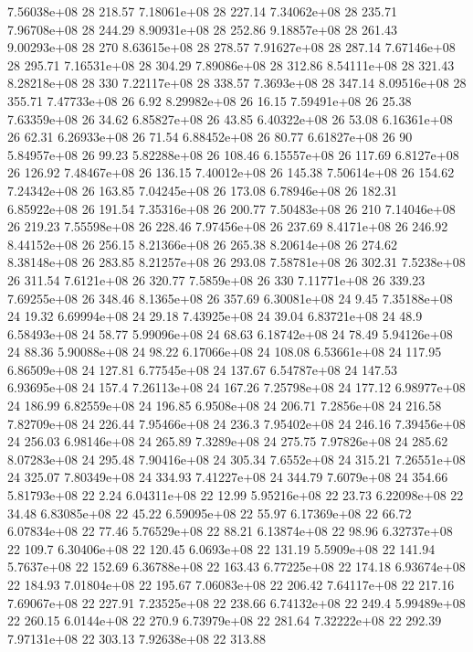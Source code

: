 7.56038e+08 28 218.57
7.18061e+08 28 227.14
7.34062e+08 28 235.71
7.96708e+08 28 244.29
8.90931e+08 28 252.86
9.18857e+08 28 261.43
9.00293e+08 28 270
8.63615e+08 28 278.57
7.91627e+08 28 287.14
7.67146e+08 28 295.71
7.16531e+08 28 304.29
7.89086e+08 28 312.86
8.54111e+08 28 321.43
8.28218e+08 28 330
7.22117e+08 28 338.57
7.3693e+08 28 347.14
8.09516e+08 28 355.71
7.47733e+08 26 6.92
8.29982e+08 26 16.15
7.59491e+08 26 25.38
7.63359e+08 26 34.62
6.85827e+08 26 43.85
6.40322e+08 26 53.08
6.16361e+08 26 62.31
6.26933e+08 26 71.54
6.88452e+08 26 80.77
6.61827e+08 26 90
5.84957e+08 26 99.23
5.82288e+08 26 108.46
6.15557e+08 26 117.69
6.8127e+08 26 126.92
7.48467e+08 26 136.15
7.40012e+08 26 145.38
7.50614e+08 26 154.62
7.24342e+08 26 163.85
7.04245e+08 26 173.08
6.78946e+08 26 182.31
6.85922e+08 26 191.54
7.35316e+08 26 200.77
7.50483e+08 26 210
7.14046e+08 26 219.23
7.55598e+08 26 228.46
7.97456e+08 26 237.69
8.4171e+08 26 246.92
8.44152e+08 26 256.15
8.21366e+08 26 265.38
8.20614e+08 26 274.62
8.38148e+08 26 283.85
8.21257e+08 26 293.08
7.58781e+08 26 302.31
7.5238e+08 26 311.54
7.6121e+08 26 320.77
7.5859e+08 26 330
7.11771e+08 26 339.23
7.69255e+08 26 348.46
8.1365e+08 26 357.69
6.30081e+08 24 9.45
7.35188e+08 24 19.32
6.69994e+08 24 29.18
7.43925e+08 24 39.04
6.83721e+08 24 48.9
6.58493e+08 24 58.77
5.99096e+08 24 68.63
6.18742e+08 24 78.49
5.94126e+08 24 88.36
5.90088e+08 24 98.22
6.17066e+08 24 108.08
6.53661e+08 24 117.95
6.86509e+08 24 127.81
6.77545e+08 24 137.67
6.54787e+08 24 147.53
6.93695e+08 24 157.4
7.26113e+08 24 167.26
7.25798e+08 24 177.12
6.98977e+08 24 186.99
6.82559e+08 24 196.85
6.9508e+08 24 206.71
7.2856e+08 24 216.58
7.82709e+08 24 226.44
7.95466e+08 24 236.3
7.95402e+08 24 246.16
7.39456e+08 24 256.03
6.98146e+08 24 265.89
7.3289e+08 24 275.75
7.97826e+08 24 285.62
8.07283e+08 24 295.48
7.90416e+08 24 305.34
7.6552e+08 24 315.21
7.26551e+08 24 325.07
7.80349e+08 24 334.93
7.41227e+08 24 344.79
7.6079e+08 24 354.66
5.81793e+08 22 2.24
6.04311e+08 22 12.99
5.95216e+08 22 23.73
6.22098e+08 22 34.48
6.83085e+08 22 45.22
6.59095e+08 22 55.97
6.17369e+08 22 66.72
6.07834e+08 22 77.46
5.76529e+08 22 88.21
6.13874e+08 22 98.96
6.32737e+08 22 109.7
6.30406e+08 22 120.45
6.0693e+08 22 131.19
5.5909e+08 22 141.94
5.7637e+08 22 152.69
6.36788e+08 22 163.43
6.77225e+08 22 174.18
6.93674e+08 22 184.93
7.01804e+08 22 195.67
7.06083e+08 22 206.42
7.64117e+08 22 217.16
7.69067e+08 22 227.91
7.23525e+08 22 238.66
6.74132e+08 22 249.4
5.99489e+08 22 260.15
6.0144e+08 22 270.9
6.73979e+08 22 281.64
7.32222e+08 22 292.39
7.97131e+08 22 303.13
7.92638e+08 22 313.88
